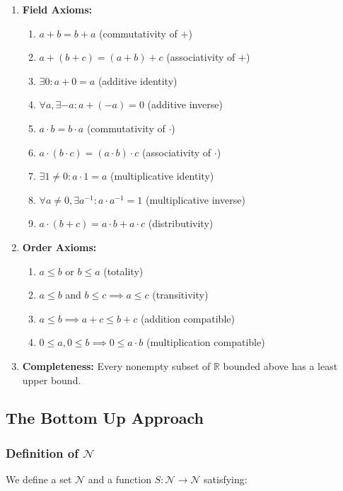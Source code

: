 \documentclass[twocolumn]{book}
\begin{document}
\begin{enumerate}
  \item \textbf{Field Axioms:}
    \begin{enumerate}
      \item $a+b=b+a$ (commutativity of $+$)
      \item $a+(b+c)=(a+b)+c$ (associativity of $+$)
      \item $\exists 0: a+0=a$ (additive identity)
      \item $\forall a, \exists -a: a+(-a)=0$ (additive inverse)
      \item $a\cdot b=b\cdot a$ (commutativity of $\cdot$)
      \item $a\cdot(b\cdot c)=(a\cdot b)\cdot c$ (associativity of $\cdot$)
      \item $\exists 1\neq 0: a\cdot 1=a$ (multiplicative identity)
      \item $\forall a\neq 0, \exists a^{-1}: a\cdot a^{-1}=1$ (multiplicative inverse)
      \item $a\cdot(b+c)=a\cdot b + a\cdot c$ (distributivity)
    \end{enumerate}
  \item \textbf{Order Axioms:}
    \begin{enumerate}
      \item $a\le b$ or $b\le a$ (totality)
      \item $a\le b$ and $b\le c \implies a\le c$ (transitivity)
      \item $a\le b \implies a+c \le b+c$ (addition compatible)
      \item $0\le a, 0\le b \implies 0\le a\cdot b$ (multiplication compatible)
    \end{enumerate}
  \item \textbf{Completeness:} Every nonempty subset of $\mathbb{R}$ bounded above has a least upper bound.
\end{enumerate}



\subsection{The Bottom Up Approach}
\subsubsection{Definition of $\mathcal{N}$}
We define a set $\mathcal{N}$ and a function $S:\mathcal{N}\to\mathcal{N}$ satisfying:
\end{document}
